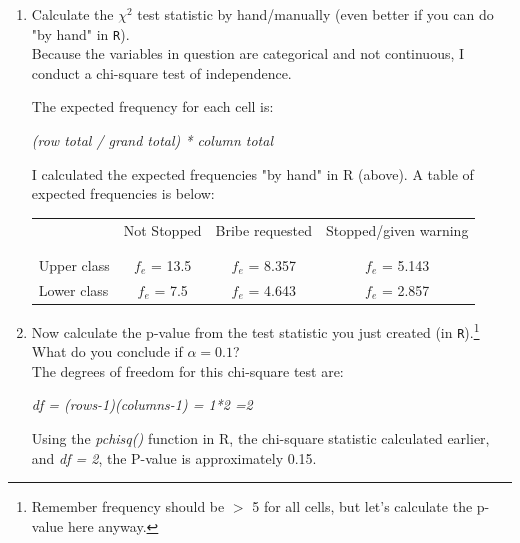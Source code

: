\documentclass[12pt,letterpaper]{article}
\begin{document}
\begin{enumerate}
	
	\item [(a)]
	Calculate the $\chi^2$ test statistic by hand/manually (even better if you can do "by hand" in \texttt{R}).\\ 
	
	Because the variables in question are categorical and not continuous, I conduct a chi-square test of independence.  \vspace{0.5cm}
		 
	
	The expected frequency for each cell is: 	\vspace{0.5cm}
	
	\textit{(row total / grand total) * column total}
	
I calculated the expected frequencies "by hand" in R (above). A table of expected frequencies is below: 
\begin{table}[h!]
	\centering
	\begin{tabular}{l | c c c }
		& Not Stopped & Bribe requested & Stopped/given warning \\
		\\[-1.8ex] 
		\hline \\[-1.8ex]
		Upper class & $f_e$ = 13.5 & $f_e$ = 8.357 & $f_e$ = 5.143 \\
		Lower class & $f_e$ = 7.5 & $f_e$ = 4.643 & $f_e$ = 2.857 \\
		\hline
	\end{tabular}
\end{table}
	
		\vspace{0.5cm}
	\item [(b)]
	Now calculate the p-value from the test statistic you just created (in \texttt{R}).\footnote{Remember frequency should be $>$ 5 for all cells, but let's calculate the p-value here anyway.}  What do you conclude if $\alpha = 0.1$?\\
	 
	
	The degrees of freedom for this chi-square test are: 	\vspace{0.5cm}
	
	\textit{df = (rows-1)(columns-1) = 1*2 =2} 	\vspace{0.5cm}
	
	Using the \textit{pchisq()} function in R, the chi-square statistic calculated earlier, and \textit{df = 2}, the P-value is approximately 0.15. \vspace{0.5cm}
	

\end{enumerate}
\end{document}

